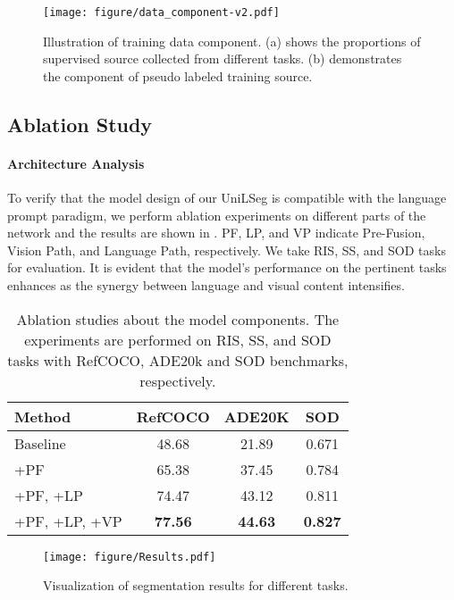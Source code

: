 \documentclass[10pt,twocolumn,letterpaper]{article}
\newcommand{\MethodName}{UniLSeg\xspace}
\begin{document}
\begin{figure}[t]
    \centering
    \texttt{[image: figure/data\_component-v2.pdf]}
    \caption{Illustration of training data component. (a) shows the proportions of supervised  source collected from different tasks. (b) demonstrates the component of pseudo labeled training source.}
    \label{fig:data_component}
\end{figure}

\subsection{Ablation Study}


\paragraph{Architecture Analysis}
To verify that the model design of our \MethodName is compatible with the language prompt paradigm, we perform ablation experiments on different parts of the network and the results are shown in . PF, LP, and VP indicate Pre-Fusion, Vision Path, and Language Path, respectively. We take RIS, SS, and SOD tasks for evaluation. It is evident that the model's performance on the pertinent tasks enhances as the synergy between language and visual content intensifies.

\begin{table}[t]
    \centering
    \small
    \setlength\tabcolsep{10.5pt}
    \renewcommand\arraystretch{1.1}
    \caption{Ablation studies about the model components. The experiments are performed on RIS, SS, and SOD tasks with RefCOCO, ADE20k and SOD benchmarks, respectively.}
    \begin{tabular}{l|c|c|c}
        \hline
        Method & RefCOCO & ADE20K & SOD\\
        \hline
Baseline &48.68 &21.89 &0.671\\
        +PF &65.38 &37.45 &0.784\\
        +PF, +LP &74.47 &43.12 &0.811\\
        +PF, +LP, +VP &\textbf{77.56} &\textbf{44.63} &\textbf{0.827} \\
        \hline
    \end{tabular}
\label{tab:model_analysis}
\end{table} 
\begin{figure*}[t]
    \centering
    \texttt{[image: figure/Results.pdf]}
    \vspace{-15pt}
    \caption{Visualization of segmentation results for different tasks.}
    \label{fig:results}
    \vspace{-5pt}
\end{figure*}
\end{document}
